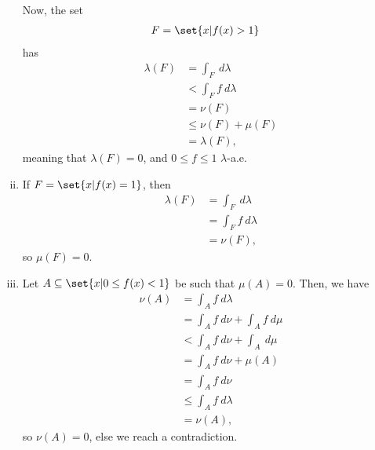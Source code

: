 \documentclass[10pt]{mypackage}
\begin{document}
\begin{enumerate}[(i)]
    Now, the set
    \begin{align*}
      F &= \set{x | f(x) > 1}
    \end{align*}
    has
    \begin{align*}
      \lambda(F) &= \int_{F}^{} \:d\lambda\\
                 &< \int_{F}^{} f\:d\lambda\\
                 &= \nu\left( F \right)\\
                 &\leq \nu\left( F \right) + \mu\left( F \right)\\
                 &= \lambda\left( F \right), 
    \end{align*}
    meaning that $\lambda(F) = 0$, and $0 \leq f \leq 1$ $\lambda$-a.e.
  \item If $F = \set{x | f(x) = 1}$, then
    \begin{align*}
      \lambda\left( F \right) &= \int_{F}^{} \:d\lambda\\
                              &= \int_{F}^{} f\:d\lambda\\
                              &= \nu\left( F \right),
    \end{align*}
    so $\mu\left( F \right) = 0$.
  \item Let $A\subseteq \set{x | 0\leq f(x) < 1}$ be such that $\mu(A) =0$. Then, we have
    \begin{align*}
      \nu\left( A \right) &= \int_{A}^{} f\:d\lambda\\
                          &= \int_{A}^{} f\:d\nu + \int_{A}^{} f\:d\mu\\
                          &< \int_{A}^{} f\:d\nu + \int_{A}^{} \:d\mu\\
                          &= \int_{A}^{} f\:d\nu + \mu\left( A \right)\\
                          &= \int_{A}^{} f\:d\nu\\
                          &\leq \int_{A}^{} f\:d\lambda\\
                          &= \nu\left( A \right),
    \end{align*}
    so $\nu\left( A \right) = 0$, else we reach a contradiction.
\end{enumerate}
\end{document}
